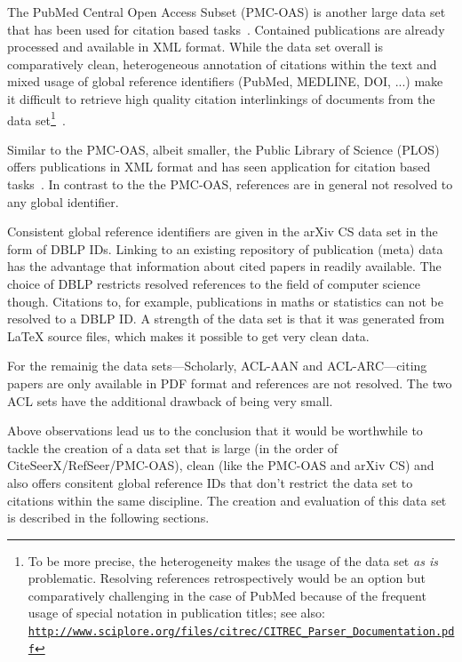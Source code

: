 The PubMed Central Open Access Subset (PMC-OAS) is another large data set that has been used for citation based tasks~\cite{Duma2016,Gipp2015,Galke2018,Bhagavatula2018}. Contained publications are already processed and available in XML format. While the data set overall is comparatively clean, heterogeneous annotation of citations within the text and mixed usage of global reference identifiers (PubMed, MEDLINE, DOI, ...) make it difficult to retrieve high quality citation interlinkings of documents from the data set\footnote{To be more precise, the heterogeneity makes the usage of the data set \emph{as is} problematic. Resolving references retrospectively would be an option but comparatively challenging in the case of PubMed because of the frequent usage of special notation in publication titles; see also: \texttt{\url{http://www.sciplore.org/files/citrec/CITREC_Parser_Documentation.pdf}}}~\cite{Gipp2015}.

Similar to the PMC-OAS, albeit smaller, the Public Library of Science (PLOS) offers publications in XML format and has seen application for citation based tasks~\cite{Bertin2016,Bertin2018}. In contrast to the the PMC-OAS, references are in general not resolved to any global identifier.

Consistent global reference identifiers are given in the arXiv CS data set in the form of DBLP IDs. Linking to an existing repository of publication (meta) data has the advantage that information about cited papers in readily available. The choice of DBLP restricts resolved references to the field of computer science though. Citations to, for example, publications in maths or statistics can not be resolved to a DBLP ID. A strength of the data set is that it was generated from \LaTeX{} source files, which makes it possible to get very clean data.

For the remainig the data sets---Scholarly, ACL-AAN and ACL-ARC---citing papers are only available in PDF format and references are not resolved. The two ACL sets have the additional drawback of being very small.

Above observations lead us to the conclusion that it would be worthwhile to tackle the creation of a data set that is large (in the order of CiteSeerX/RefSeer/PMC-OAS), clean (like the PMC-OAS and arXiv CS) and also offers consitent global reference IDs that don't restrict the data set to citations within the same discipline. The creation and evaluation of this data set is described in the following sections.


